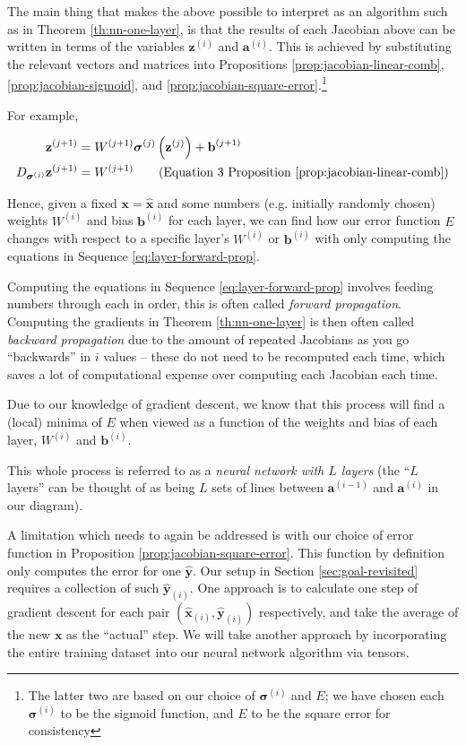 \documentclass[a4paper]{article}
\theoremstyle{plain} %
\theoremstyle{definition} %
\numberwithin{equation}{subsection}
\newcommand{\vx}{{\textbf{x}}}
\newcommand{\vz}{{\textbf{z}}}
\newcommand{\va}{{\textbf{a}}}
\newcommand{\vb}{{\textbf{b}}}
\newcommand{\vsigma}{{\bm{\sigma}}} %
\newcommand{\vxh}{{\widehat{\textbf{x}}}}
\newcommand{\vyh}{{\widehat{\textbf{y}}}}
\begin{document}
The main thing that makes the above possible to interpret as an algorithm such as in Theorem \ref{th:nn-one-layer}, 
is that the results of each Jacobian above can be written in terms of the variables $\vz^{(i)}$ and $\va^{(i)}$. 
This is achieved by substituting the relevant vectors and matrices into 
Propositions \ref{prop:jacobian-linear-comb}, \ref{prop:jacobian-sigmoid}, and \ref{prop:jacobian-square-error}.\footnote{The latter two are based on our choice of $\vsigma^{(i)}$ and $E$; we have chosen each $\vsigma^{(i)}$ to be the sigmoid function, and $E$ to be the square error for consistency}

For example, 

\begin{align*}
  \vz^{(j+1)} &= W^{(j+1)} \vsigma^{(j)} \left(\vz^{(j)}\right)  + \vb^{(j+1)} \\
  D_{\vsigma^{(j)}}\vz^{(j+1)} &= W^{(j+1)} \tag{Equation 3 Proposition \ref{prop:jacobian-linear-comb}}
\end{align*}

Hence, given a fixed $\vx = \vxh$ and some numbers (e.g. initially randomly chosen) weights $W^{(i)}$ and bias $\vb^{(i)}$ for each layer, 
we can find how our error function $E$ changes with respect to a specific layer's $W^{(i)}$ or $\vb^{(i)}$ with only computing the equations in Sequence
\ref{eq:layer-forward-prop}. 

Computing the equations in Sequence
\ref{eq:layer-forward-prop}
involves feeding numbers through each in order, this is often called \emph{forward propagation}. 
Computing the gradients in Theorem \ref{th:nn-one-layer} is then often called 
\emph{backward propagation} due to the amount of repeated Jacobians as you go ``backwards'' in $i$ values
-- these do not need to be recomputed each time, which saves a lot of computational expense over computing each Jacobian each time.

Due to our knowledge of gradient descent, we know that this process will find a (local) minima of 
$E$ when viewed as a function of the weights and bias of each layer, $W^{(i)}$ and $\vb^{(i)}$.

This whole process is referred to as a \emph{neural network with $L$ layers} (the ``$L$ layers'' can be thought of as being $L$ sets of lines between $\va^{(i-1)}$ and $\va^{(i)}$ in our diagram).

A limitation which needs to again be addressed is with our choice of error function in Proposition \ref{prop:jacobian-square-error}. 
This function by definition only computes the error for one $\vyh$. Our setup in Section \ref{sec:goal-revisited} requires a collection of such $\vyh_{(i)}$. 
One approach is to calculate one step of gradient descent for each pair $(\vxh_{(i)}, \vyh_{(i)})$ respectively, and take the average of the new $\vx$ as the ``actual'' step.
We will take another approach by incorporating the entire training dataset into our neural network algorithm via tensors.
\newpage
\end{document}
